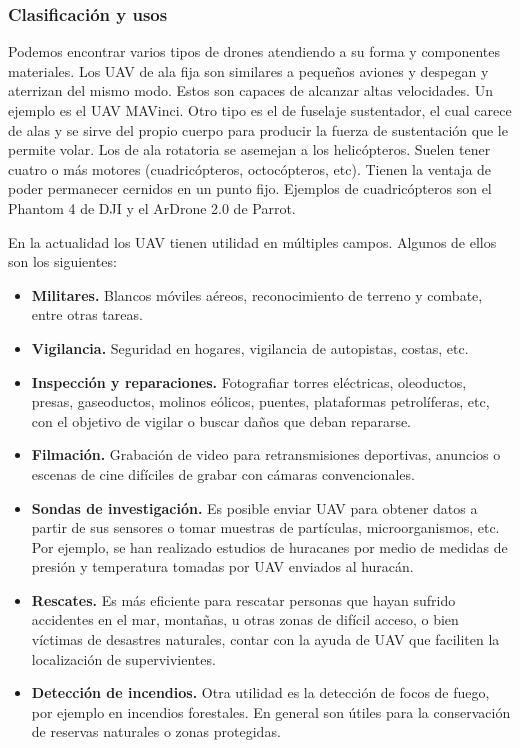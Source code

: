 \subsubsection{Clasificación y usos}

Podemos encontrar varios tipos de drones atendiendo a su forma y componentes materiales. Los UAV de ala fija son similares a pequeños aviones y despegan y aterrizan del mismo modo. Estos son capaces de alcanzar altas velocidades. Un ejemplo es el UAV MAVinci. Otro tipo es el de fuselaje sustentador, el cual carece de alas y se sirve del propio cuerpo para producir la fuerza de sustentación que le permite volar. Los de ala rotatoria se asemejan a los helicópteros. Suelen tener cuatro o más motores (cuadricópteros, octocópteros, etc). Tienen la ventaja de poder permanecer cernidos en un punto fijo. Ejemplos de cuadricópteros son el Phantom 4 de DJI y el ArDrone 2.0 de Parrot.

En la actualidad los UAV tienen utilidad en múltiples campos. Algunos de ellos son los siguientes:

\begin{itemize}
 \item \textbf{Militares.} Blancos móviles aéreos, reconocimiento de terreno y combate, entre otras tareas. 
 \item \textbf{Vigilancia.} Seguridad en hogares, vigilancia de autopistas, costas, etc. 
 \item \textbf{Inspección y reparaciones.} Fotografiar torres eléctricas, oleoductos, presas, gaseoductos, molinos eólicos, puentes, plataformas petrolíferas, etc, con el objetivo de vigilar o buscar daños que deban repararse.
 \item \textbf{Filmación.} Grabación de video para retransmisiones deportivas, anuncios o escenas de cine difíciles de grabar con cámaras convencionales.
 \item \textbf{Sondas de investigación.} Es posible enviar UAV para obtener datos a partir de sus sensores o tomar muestras de partículas, microorganismos, etc. Por ejemplo, se han realizado estudios de huracanes por medio de medidas de presión y temperatura tomadas por UAV enviados al huracán.
 \item \textbf{Rescates.} Es más eficiente para rescatar personas que hayan sufrido accidentes en el mar, montañas, u otras zonas de difícil acceso, o bien víctimas de desastres naturales, contar con la ayuda de UAV que faciliten la localización de supervivientes.
 \item \textbf{Detección de incendios.} Otra utilidad es la detección de focos de fuego, por ejemplo en incendios forestales. En general son útiles para la conservación de reservas naturales o zonas protegidas.
\end{itemize}


